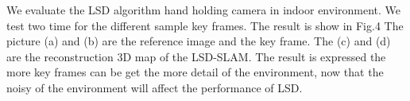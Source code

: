 \iffalse
We evaluate the LSD algorithm hand holding camera in indoor environment. We test two time for the different sample key frames. The result is show in Fig.4 The picture (a) and (b) are the reference image and the key frame. The (c) and (d) are the reconstruction 3D map of the LSD-SLAM. The result is expressed the more key frames can be get the more detail of the environment, now that the noisy of the environment will affect the performance of LSD.

\begin{figure}
    \centering
          \hspace{0in}
     

\end{figure}

